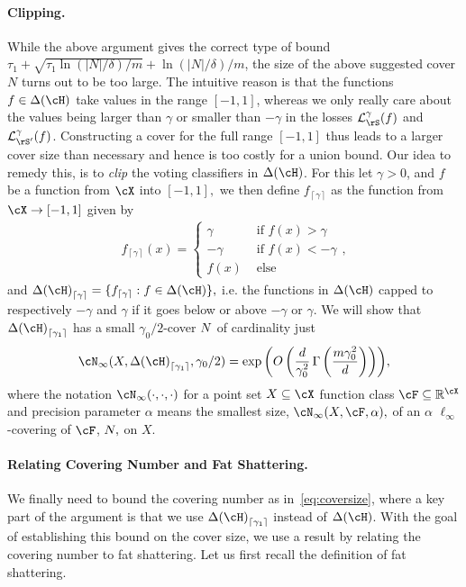 \paragraph{Clipping.}
While the above argument gives the correct type of bound  $\tau_{1} +\sqrt{\tau_{1}\ln{\left(|N|/\delta \right)}/m} +\ln{\left(|N|/\delta \right)}/m$, the size of the above suggested cover $ N $ turns out to be too large.
The intuitive reason is that the functions $f \in \dlh$ take values in the range $[-1,1]$, whereas we only really care about the values being larger than $\gamma$ or smaller than $-\gamma$ in the losses $\ls_{\rS}^\gamma(f)$ and $\ls_{\rS'}^\gamma(f)$. Constructing a cover for the full range $[-1,1]$ thus leads to a larger cover size than necessary and hence is too costly for a union bound.
Our idea to remedy this, is to \emph{clip} the voting classifiers in $\dlh$. For this let $ \gamma>0 $, and $ f $ be a function from $ \cX $ into $ [-1,1],$ we then define  $ f_{\left\lceil\gamma\right\rceil} $ as the function from $ \cX\rightarrow [-1,1] $ given by
\begin{align}
    f_{\left\lceil\gamma\right\rceil}(x)=\begin{cases}
        \gamma &\text{ if }f(x)> \gamma
        \\
        -\gamma &\text{ if } f(x)<- \gamma
        \\
        f(x) &\text{ else }
    \end{cases},
\end{align}         
and $ \dlh_{\left\lceil\gamma \right\rceil}=\{ f_{\left\lceil\gamma\right\rceil}:f\in \dlh \},$ i.e. the functions in $ \dlh $ capped to respectively $ -\gamma $ and $ \gamma $ if it goes below or above $ -\gamma $ or $ \gamma $. We will show that $\dlh_{\left\lceil\gamma_1 \right\rceil}$ has a small $\gamma_0/2$-cover $ N $ of cardinality just
\begin{align}
  \cN_{\infty}(X,\dlh_{\left\lceil\gamma_1 \right\rceil},\gamma_0/2)=\exp{\left(O\left( \frac{d}{\gamma_0^{2}}\func{\left(\frac{m\gamma_0^{2}}{d} \right)} \right)\right)}, \label{eq:coversize}
\end{align} 
where the notation $ \cN_{\infty}(\cdot,\cdot,\cdot) $  for a point set $ X\subseteq \cX$   function class $ \cF\subseteq \mathbb{R}^{\cX}$ and precision parameter $ \alpha $ means the smallest size, $ \cN_{\infty}(X,\cF,\alpha),$  of an $ \alpha $ $ \ell_{\infty} $-covering of $ \cF $, $ N,$  on $ X $. 
\paragraph{Relating Covering Number and Fat Shattering.}
We finally need to bound the covering number as in~\cref{eq:coversize}, where a key part of the argument is that we use $ \dlh_{\left\lceil\gamma_1 \right\rceil} $ instead of $\dlh $.  With the goal of establishing this bound on the cover size, we use a result by \cite{RudelsonVershynin} relating the covering number to fat shattering. Let us first recall the definition of fat shattering.

